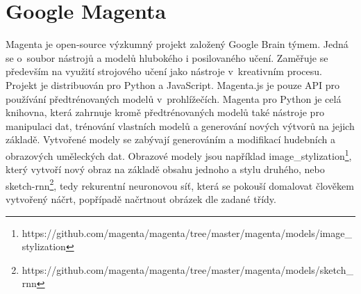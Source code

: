 \section{Google Magenta}
\label{magenta}
Magenta je open-source výzkumný projekt založený Google Brain týmem.
Jedná se o~soubor nástrojů a modelů hlubokého i posilovaného učení.
Zaměřuje se především na využití strojového učení jako nástroje
v~kreativním procesu.
Projekt je distribuován pro Python a JavaScript.
Magenta.js je pouze API pro používání předtrénovaných modelů v~prohlížečích.
Magenta pro Python je celá knihovna, která zahrnuje kromě předtrénovaných modelů
také nástroje pro manipulaci dat, trénování vlastních modelů a generování
nových výtvorů na jejich základě.
\cite{google_magentaHome} 
Vytvořené modely se zabývají generováním a modifikací hudebních 
a obrazových uměleckých dat.
Obrazové modely jsou například image\_stylization\footnote{https://github.com/magenta/magenta/tree/master/magenta/models/image\_stylization},
který vytvoří nový obraz na základě obsahu jednoho a stylu druhého\cite{dumoulin2017learned},
nebo sketch-rnn\footnote{https://github.com/magenta/magenta/tree/master/magenta/models/sketch\_rnn},
tedy rekurentní neuronovou síť, která se pokouší domalovat člověkem vytvořený náčrt,
popřípadě načrtnout obrázek dle zadané třídy\cite{ha2017neural}.
\par

